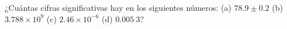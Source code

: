 \item ¿Cuántas cifras significativas hay en los siguientes números: (a) $78.9 \pm 0.2$ (b) $3.788 \times 10^9$ (c) $2.46 \times 10^{-6}$ (d) $0.005\ 3$?
